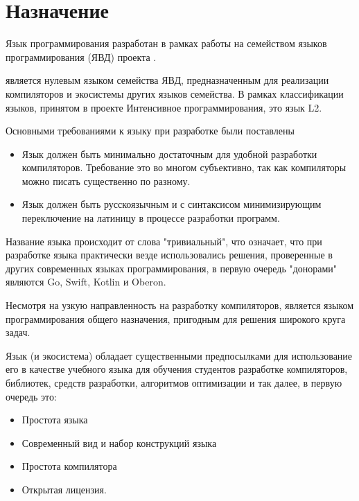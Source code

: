 \hypertarget{target}{
\section{Назначение}\label{target:chapter}}

Язык программирования \thelang{} разработан в рамках работы на семейством языков программирования \href{http://алексейнедоря.рф/?p=419}{}  (ЯВД)  проекта \href{http://digital-economy.ru/stati/интенсивное-программирование}{}.

\thelang{} является нулевым языком семейства ЯВД, предназначенным для реализации компиляторов и экосистемы других языков семейства. В рамках классификации языков, принятом в проекте Интенсивное программирования, это язык L2.


Основными требованиями к языку при разработке были поставлены
\begin{itemize}
\item 
    Язык должен быть минимально достаточным для удобной разработки компиляторов. Требование это во многом субъективно, так как компиляторы можно писать существенно по разному.
\item 
    Язык должен быть русскоязычным и с синтаксисом минимизирующим переключение на латиницу в процессе разработки программ.
\end{itemize}

Название языка происходит от слова "тривиальный", что означает, что при разработке языка практически везде использовались решения, проверенные в других современных языках программирования, в первую очередь "донорами" являются Go, Swift, Kotlin и Oberon.

Несмотря на узкую направленность на разработку компиляторов, \thelang{} является языком программирования общего назначения, пригодным для решения широкого круга задач.

Язык (и экосистема) обладает существенными предпосылками для использование его в качестве учебного языка для обучения студентов разработке компиляторов, библиотек, средств разработки, алгоритмов оптимизации и так далее, в первую очередь это:
\begin{itemize}
\item 
    Простота языка
\item 
    Современный вид и набор конструкций языка
\item 
    Простота компилятора
\item 
    Открытая лицензия.
\end{itemize}


